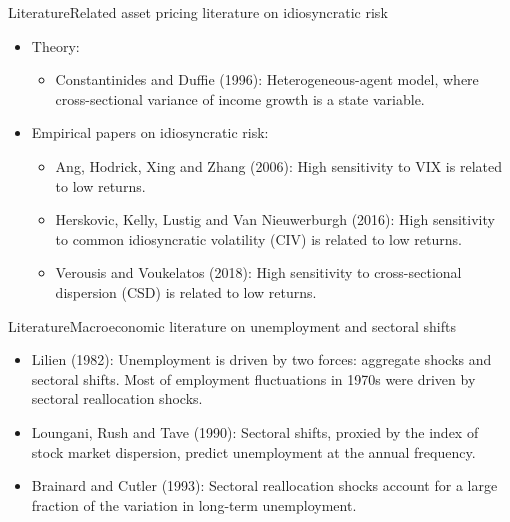 \documentclass{beamer}
\begin{document}
\begin{frame}{Literature}{Related asset pricing literature on idiosyncratic risk}
\begin{itemize}
    \item {Theory:}
    \begin{itemize}
        \item {Constantinides and Duffie (1996): Heterogeneous-agent model, where cross-sectional variance of income growth is a state variable.}
    \end{itemize}
    \item {Empirical papers on idiosyncratic risk:}
    \begin{itemize}
        \item {Ang, Hodrick, Xing and Zhang (2006): High sensitivity to VIX is related to low returns.}
        \item {Herskovic, Kelly, Lustig and Van Nieuwerburgh (2016): High sensitivity to common idiosyncratic volatility (CIV) is related to low returns.}
        \item {Verousis and Voukelatos (2018): High sensitivity to cross-sectional dispersion (CSD) is related to low returns.}
    \end{itemize}
\end{itemize}
\end{frame}



\begin{frame}{Literature}{Macroeconomic literature on unemployment and sectoral shifts}
\begin{itemize}
    \item {Lilien (1982): Unemployment is driven by two forces: aggregate shocks and sectoral shifts. Most of employment fluctuations in 1970s were driven by sectoral reallocation shocks.}
    \item {Loungani, Rush and Tave (1990): Sectoral shifts, proxied by the index of stock market dispersion, predict unemployment at the annual frequency.}
    \item {Brainard and Cutler (1993): Sectoral reallocation shocks account for a large fraction of the variation in long-term unemployment.}
\end{itemize}
\end{frame}
\end{document}
